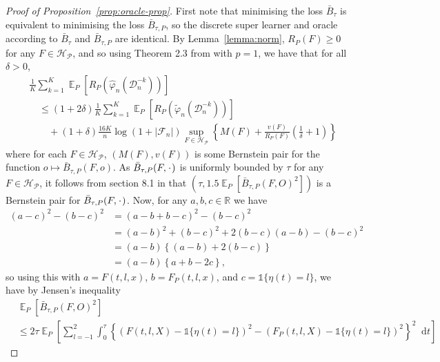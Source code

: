 \documentclass[a4paper,danish]{article}
\theoremstyle{plain} %
\numberwithin{theorem}{section}
\theoremstyle{definition} %
\theoremstyle{remark}
\DeclareMathOperator{\E}{\mathbb{E}} %
\newcommand{\R}{\mathbb{R}}
\newcommand{\blank}{\makebox[1ex]{\textbf{$\cdot$}}}
\renewcommand{\phi}{\varphi}
\newcommand*\diff{\mathop{}\!\mathrm{d}}
\newcommand{\1}{\mathds{1}}
\newcommand{\data}{\ensuremath{\mathcal{D}}}
\begin{document}
\begin{proof}[Proof of Proposition~\ref{prop:oracle-prop}]
  First note that minimising the loss \( \bar{B}_{\tau} \) is equivalent to
  minimising the loss \( \bar{B}_{\tau,P} \), so the discrete super learner and
  oracle according to \( \bar{B}_{\tau} \) and \( \bar{B}_{\tau,P} \) are
  identical. By Lemma~\ref{lemma:norm}, \( R_P(F) \geq 0 \) for any
  \( F \in \mathcal{H}_{\mathcal{P}} \), and so using Theorem 2.3 from
  \citep{vaart2006oracle} with \( p=1 \), we have that for all \( \delta >0 \),
\begin{align*}
  & \frac{1}{K} \sum_{k=1}^{K} \E_{P}{\left[ R_P(\hat{\phi}_n(\data_n^{-k})) \right]}
  \\
  &  \quad \leq
    (1+2\delta)\frac{1}{K} \sum_{k=1}^{K}\E_{P}{\left[ R_P(\tilde{\phi}_n(\data_n^{-k})) \right]}
  \\
  & \qquad + (1+\delta) \frac{16 K}{n}
    \log(1 + |\mathcal{F}_n|)\sup_{F \in \mathcal{H}_{\mathcal{P}}}
    \left\{
    M(F) + \frac{v(F)}{R_P(F)}
    \left(
    \frac{1}{\delta} + 1
    \right)
    \right\}
\end{align*}
where for each \( F \in \mathcal{H}_{\mathcal{P}} \),
\( (M(F), v(F)) \) is some Bernstein pair for the function
\(o \mapsto \bar{B}_{\tau,P}(F, o) \). As
\( \bar{B}_{\tau,P}(F, \blank) \) is uniformly bounded by \( \tau \)
for any \( F \in \mathcal{H}_{\mathcal{P}} \), it follows from section
8.1 in \citep{vaart2006oracle} that
\( (\tau, 1.5 \E_P{[\bar{B}_{\tau,P}(F, O)^2]}) \) is a Bernstein
pair for \( \bar{B}_{\tau,P}(F, \blank) \). Now, for any
\( a,b,c \in \R \) we have
\begin{align*}
  (a-c)^2 - (b-c)^2
  & = (a-b+b-c)^2 - (b-c)^2
  \\
  & = (a-b)^2 + (b-c)^2 +2(b-c)(a-b) - (b-c)^2
  \\
  & = (a-b)
    \left\{
    (a-b) +  2(b-c)
    \right\}
  \\
  & = (a-b)
    \left\{
     a + b -2c
    \right\},
\end{align*}
so using this with \( a=F(t, l, x) \), \( b=F_P(t, l, x) \), and
\( c = \1{\{\eta(t) = l\}} \), we have by Jensen's inequality
\begin{align*}
  & \E_P{[\bar{B}_{\tau,P}(F, O)^2]}
  \\
  & \leq
    2\tau\E_{P}{\left[
    \sum_{l=-1}^{2} \int_0^{\tau}
    \left\{
    \left(
    F(t, l, X) - \1{\{\eta(t) = l\}}
    \right)^2
    -
    \left(
    F_P(t, l, X) - \1{\{\eta(t) = l\}}
    \right)^2
    \right\}^2
    \diff t 
    \right]}

\end{align*}
\end{proof}
\end{document}
